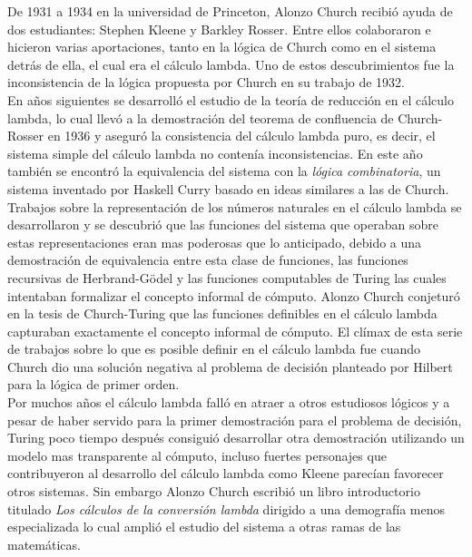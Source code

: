 De 1931 a 1934 en la universidad de Princeton, Alonzo Church recibió
ayuda de dos estudiantes: Stephen Kleene y Barkley Rosser. Entre ellos
colaboraron e hicieron varias aportaciones, tanto en la lógica de Church como en
el sistema detrás de ella, el cual era el cálculo lambda. Uno de estos descubrimientos
fue la inconsistencia de la lógica propuesta por Church en su trabajo
de 1932.\\

En años siguientes se desarrolló el estudio de la teoría de reducción
en el cálculo lambda, lo cual llevó a la demostración del teorema de
confluencia de Church-Rosser en 1936 y aseguró la consistencia del
cálculo lambda puro, es decir, el sistema simple del cálculo lambda no contenía
inconsistencias. En este año también se encontró la equivalencia del
sistema con la \emph{lógica combinatoria}, un sistema inventado por
Haskell Curry basado en ideas similares a las de Church.\\

Trabajos sobre la representación de los números naturales en el cálculo lambda
se desarrollaron y se descubrió que las funciones del sistema que
operaban sobre estas representaciones eran mas poderosas que lo
anticipado, debido a una demostración de equivalencia entre esta clase
de funciones, las funciones recursivas de Herbrand-Gödel y las
funciones computables de Turing las cuales intentaban formalizar el
concepto informal de cómputo. Alonzo Church conjeturó en la tesis de
Church-Turing que las funciones definibles en el cálculo lambda capturaban
exactamente el concepto informal de cómputo. El clímax de esta serie
de trabajos sobre lo que es posible definir en el cálculo lambda fue cuando
Church dio una solución negativa al problema de decisión planteado por
Hilbert para la lógica de primer orden.\\

Por muchos años el cálculo lambda falló en atraer a otros estudiosos lógicos y
a pesar de haber servido para la primer demostración para
el problema de decisión, Turing poco tiempo después consiguió
desarrollar otra demostración utilizando un modelo mas transparente al
cómputo, incluso fuertes personajes que contribuyeron al desarrollo
del cálculo lambda como Kleene parecían favorecer otros sistemas. Sin embargo
Alonzo Church escribió un libro introductorio titulado \emph{Los
  cálculos de la conversión lambda} dirigido a una demografía menos
especializada lo cual amplió el estudio del sistema a otras ramas de
las matemáticas.\\

